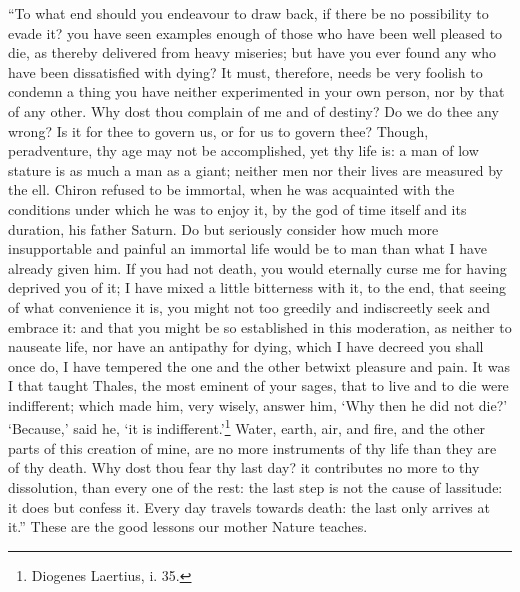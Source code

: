 ``To what end should you endeavour to draw back, if there be no
possibility to evade it? you have seen examples enough of those who
have been well pleased to die, as thereby delivered from heavy
miseries; but have you ever found any who have been dissatisfied with
dying? It must, therefore, needs be very foolish to condemn a thing
you have neither experimented in your own person, nor by that of any
other. Why dost thou complain of me and of destiny? Do we do thee any
wrong? Is it for thee to govern us, or for us to govern thee? Though,
peradventure, thy age may not be accomplished, yet thy life is: a man
of low stature is as much a man as a giant; neither men nor their
 lives are measured by the ell. Chiron refused to be
immortal, when he was acquainted with the conditions under which he
was to enjoy it, by the god of time itself and its duration, his
father Saturn. Do but seriously consider how much more insupportable
and painful an immortal life would be to man than what I have already
given him. If you had not death, you would eternally curse me for
having deprived you of it; I have mixed a little bitterness with it,
to the end, that seeing of what convenience it is, you might not too
greedily and indiscreetly seek and embrace it: and that you might be
so established in this moderation, as neither to nauseate life, nor
have an antipathy for dying, which I have decreed you shall once do, I
have tempered the one and the other betwixt pleasure and pain. It was
I that taught Thales, the most eminent of your sages, that to live and
to die were indifferent; which made him, very wisely, answer him, `Why
then he did not die?' `Because,' said he, `it is
indifferent.'\footnote{Diogenes Laertius, i. 35.} Water, earth, air,
and fire, and the other parts of this creation of mine, are no more
instruments of thy life than they are of thy death. Why dost thou fear
thy last day? it contributes no more to thy dissolution, than every
one of the rest: the last step is not the cause of lassitude: it does
but confess it. Every day travels towards death: the last only arrives
at it.'' These are the good lessons our mother Nature teaches.

